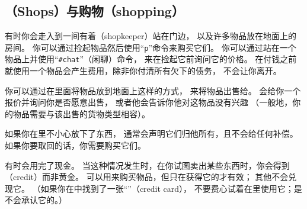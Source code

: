 \documentclass[a4paper, 10pt]{article}
\begin{document}
\subsection*{\zhTransShop（Shops）与购物（shopping）}

有时你会走入到一间有着\zhTransShopkeeper{}（shopkeeper）站在门边，
以及许多物品放在地面上的房间。
你可以通过捡起物品然后使用“{\tt p}”命令来购买它们。
你可以通过站在一个物品上并使用“{\tt \#chat}”（闲聊）命令，
来在捡起它前询问它的价格。
在付钱之前就使用一个物品会产生费用，除非你付清所有欠下的债务，
\zhTransShopkeeper{}不会让你离开\zhTransShop。

你可以通过在\zhTransShop{}里面将物品放到地面上这样的方式，
来将物品出售给\zhTransShopkeeper。
\zhTransShopkeeper{}会给你一个报价并询问你是否愿意出售，
或者他会告诉你他对这物品没有兴趣
（一般地，你的物品需要与该\zhTransShop{}出售的货物类型相容）。

如果你在\zhTransShop{}里不小心放下了东西，
\zhTransShopkeeper{}通常会声明它们归他所有，且不会给任何补偿。
如果你要取回的话，你需要购买它们。

\zhTransShopkeeper{}有时会用完了现金。
当这种情况发生时，在你试图卖出某些东西时，你会得到\zhTransCredit{}（credit）而非黄金。
\zhTransCredit{}可以用来购买物品，但只在获得它的\zhTransShop{}才有效；
其他\zhTransShopkeeper{}不会兑现它。
（如果你在\zhTransDungeon{}中找到了一张“\zhTransCreditCard”（credit card），
不要费心试着在\zhTransShop{}里使用它；\zhTransShopkeeper{}是不会承认它的。）
\end{document}
